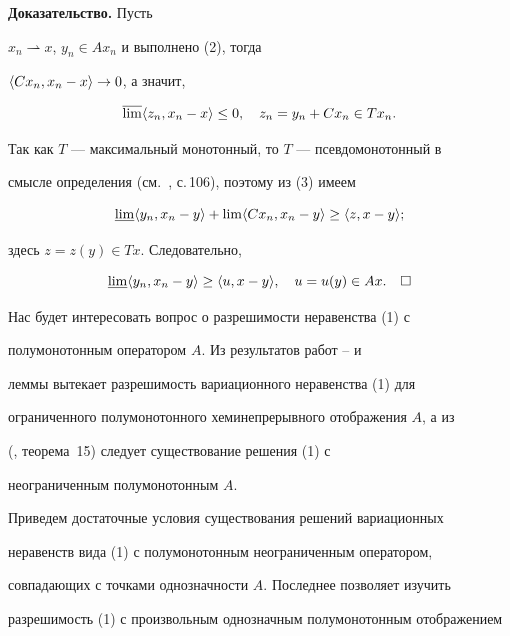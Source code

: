  


{\bf Доказательство.} Пусть 


$x_n\rightharpoonup x$, $y_n\in Ax_n$ и выполнено (2), тогда 


$\langle C x_n,x_n-x\rangle\to 0$, а значит, 


\begin{equation} 


\varlimsup\la z_n,x_n-x\ra\le 0,\quad z_n=y_n+C x_n\in T x_n. 


\end{equation} 


Так как $T$ --- максимальный монотонный, то $T$ --- псевдомонотонный в 


смысле определения (см.~\cite{4}, с.\,106), поэтому из (3) имеем 


$$ 


\varliminf\la y_n,x_n-y\ra+\lim\la C x_n,x_n-y\ra\ge 


\la z,x-y\ra; 


$$ 


здесь $z=z(y)\in T x$. Следовательно, 


$$ 


\varliminf\la y_n,x_n-y\ra\ge\la u,x-y\ra,\quad u=u(y)\in Ax. 


\quad\square 


$$ 


 


Нас будет интересовать вопрос о разрешимости неравенства (1) с 


полумонотонным оператором $A$. Из результатов работ \cite{4}--\cite{6} и 


леммы вытекает разрешимость вариационного неравенства (1) для 


ограниченного полумонотонного хеминепрерывного отображения $A$, а из 


(\cite{7}, теорема~15) следует существование решения (1) с 


неограниченным полумонотонным $A$. 


 


Приведем достаточные условия существования решений вариационных 


неравенств вида (1) с полумонотонным неограниченным оператором, 


совпадающих с точками однозначности $A$. Последнее позволяет изучить 


разрешимость (1) с произвольным однозначным полумонотонным отображением 


